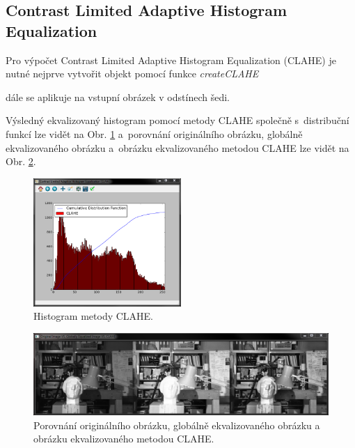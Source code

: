 \documentclass[12pt, a4paper]{article}
\begin{document}
\subsection{Contrast Limited Adaptive Histogram Equalization}
\label{sec:CLAHE}

\par{Pro výpočet Contrast Limited Adaptive Histogram Equalization (CLAHE) je nutné nejprve vytvořit objekt pomocí funkce \textit{createCLAHE}

dále se aplikuje na vstupní obrázek v odstínech šedi.

Výsledný ekvalizovaný histogram pomocí metody CLAHE společně s~distribuční funkcí lze vidět na Obr. \ref{fig:GSEQCLAHE_histogram} a~porovnání originálního obrázku, globálně ekvalizovaného obrázku a~obrázku ekvalizovaného metodou CLAHE lze vidět na Obr. \ref{fig:GSvsEQvsCLAHE_image}.
\begin{figure}[!ht]
	\centering
	\includegraphics[width=0.5\textwidth]{GSEQCLAHE_histogram.png}
	\caption{Histogram metody CLAHE.}	
	\label{fig:GSEQCLAHE_histogram}
\end{figure}
\begin{figure}[!ht]
	\centering
	\includegraphics[width=1\textwidth]{GSvsEQvsCLAHE_image.png}
	\caption{Porovnání originálního obrázku, globálně ekvalizovaného obrázku a obrázku ekvalizovaného metodou CLAHE.} 	
	\label{fig:GSvsEQvsCLAHE_image}
\end{figure}}
\end{document}

